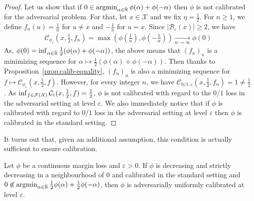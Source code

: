 \begin{proof}

    Let us show that if $0\in\operatorname*{argmin}_{\alpha\in\bar{\mathbb{R}}} \phi(\alpha)+\phi(-\alpha)$ then $\phi$ is not calibrated for the adversarial problem. For that, let $x\in\mathcal{X}$ and we fix $\eta = \frac12$.  For $n\geq1$, we define $f_n(u) = \frac1n$ for $u\neq x$ and $-\frac{1}{n}$ for $u=x$.  Since $\lvert\mathcal{B}_\varepsilon(x)\rvert\geq 2$, we have
    \begin{align*}
         \mathcal{C}_{\phi_\varepsilon}(x,\frac12,f_n) = \max\left(\phi(\frac1n),\phi(-\frac1n)\right)\xrightarrow[n\to\infty]{} \phi(0) %
    \end{align*}
    As, $\phi(0) = \inf_{\alpha\in\bar{\RR}}\frac12\left(\phi(\alpha)+\phi(-\alpha)\right)$, the above means that $(f_n)_n$ is a minimizing sequence for $\alpha \mapsto \frac12 \left(\phi(\alpha)+\phi(-\alpha)\right)$. 
    Then thanks to Proposition~\ref{prop:calib-equality}, $(f_n)_n$ is also a minimizing sequence for $f \mapsto\mathcal{C}_{\phi_\varepsilon}(x,\frac12,f)$. However, for every integer $n$, we have $\mathcal{C}_{0/1,\varepsilon}(x,\frac12,f_n) =1\neq\frac12$. As  $\inf_{f\in\mathcal{F}(\mathcal{X})}\mathcal{C}_{\varepsilon}(x,\frac12,f)=\frac12$, $\phi$ is not calibrated with regard to the $0/1$ loss in the adversarial setting at level $\varepsilon$. We also immediately notice that if $\phi$ is  calibrated with regard to  $0/1$ loss in the adversarial setting at level $\varepsilon$ then $\phi$ is calibrated in the standard setting. 
    
    
\end{proof}



It turns out that, given an additional assumption, this condition is actually sufficient to ensure calibration.


\begin{thm} 
\label{thm:calibration-suf}
Let $\phi$  be a continuous margin loss and $\varepsilon>0$. If $\phi$ is decreasing and strictly decreasing in a neighbourhood of $0$ and calibrated in the standard setting and $0\not\in \operatorname*{argmin}_{\alpha\in\bar{\mathbb{R}}}
\frac12\phi(\alpha)+\frac12\phi(-\alpha)$, then $\phi$ is adversarially uniformly calibrated at level $\varepsilon$.
\end{thm}


